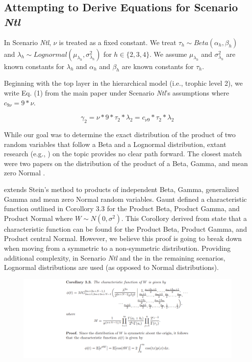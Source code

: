 \documentclass[oneside,12pt,final]{sty/ucthesis-CA2012}
\let\cite\citep                             %
\begin{document}
\begin{mainmatter}
\subsection{Attempting to Derive Equations for Scenario \textit{Ntl}}
In Scenario \textit{Ntl}, $\nu$ is treated as a fixed constant. We treat $\tau_h \sim Beta(\alpha_h, \beta_h)$ and $\lambda_h \sim Lognormal(\mu_{\lambda_h}, \sigma^2_{\lambda_h} )$ for $h \in \{2, 3, 4\}$. We assume $\mu_{\lambda_h}$ and $\sigma^2_{\lambda_h} $ are known constants for $\lambda_h$ and $\alpha_h$ and $\beta_h$ are known constants for $\tau_h$.

\vspace{5mm}

Beginning with the top layer in the hierarchical model (i.e., trophic level 2), we write Eq. (1) from the main paper under Scenario \textit{Ntl}'s assumptions where $c_{9\nu}=9*\nu$.

\begin{equation*}
\gamma_2 = \nu * 9 * \tau_2 *\lambda_2 = c_{\nu9}*\tau_2*\lambda_2 
\end{equation*}

While our goal was to determine the exact distribution of the product of two random variables that follow a Beta and a Lognormal distribution, extant research (e.g., \citealt{casella2002statistical, rohatgi2015introduction}) on the topic provides no clear path forward. The closest match were two papers on the distribution of the product of a Beta, Gamma, and mean zero Normal \cite{springer1970distribution, gaunt2018products}. 

\vspace{5mm}

\citealt{gaunt2018products} extends Stein's method to products of independent Beta, Gamma, generalized Gamma and mean zero Normal random variables. Gaunt defined a characteristic function outlined in Corollory 3.3 for the Product Beta, Product Gamma, and Product Normal where $W \sim N(0, \sigma^2)$. This Corollory derived from \citealt{gaunt2018products} state that a characteristic function can be found for the Product Beta, Product Gamma, and Product central Normal. However, we believe this proof is going to break down when moving from a symmetric to a non-symmetric distribution. 
Providing additional complexity, in Scenario \textit{Ntl} and the in the remaining scenarios, Lognormal distributions are used (as opposed to Normal distributions). 

\begin{figure}[H]
     \centering
       \includegraphics[width=1\textwidth]{fig/Stein}
\end{figure}


\end{mainmatter}
\end{document}
